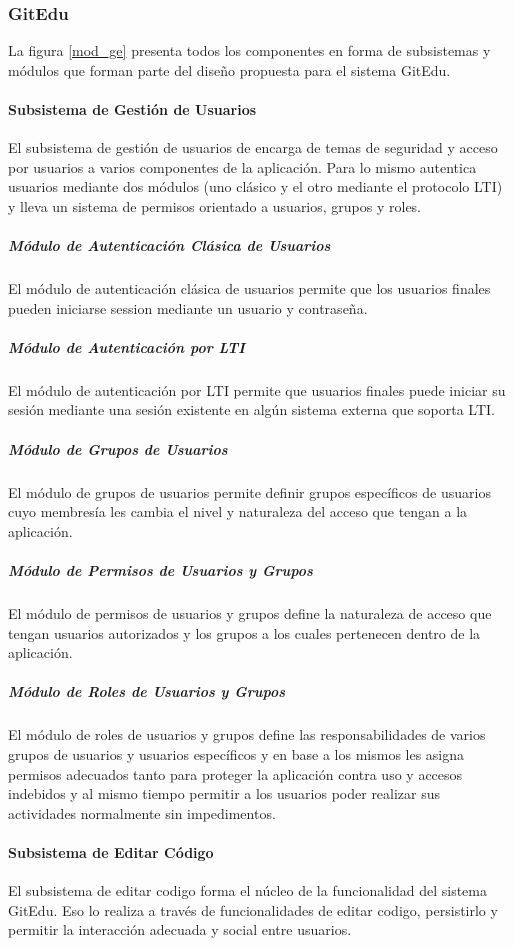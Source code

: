 \subsubsection{GitEdu}

La figura \ref{mod_ge} presenta todos los componentes en forma de subsistemas y módulos que forman parte del diseño propuesta para el sistema GitEdu.

\paragraph{Subsistema de Gestión de Usuarios}
El subsistema de gestión de usuarios de encarga de temas de seguridad y acceso por usuarios a varios componentes de la aplicación. Para lo mismo autentica usuarios mediante dos módulos (uno clásico y el otro mediante el protocolo LTI) y lleva un sistema de permisos orientado a usuarios, grupos y roles.

\subparagraph{Módulo de Autenticación Clásica de Usuarios}
El módulo de autenticación clásica de usuarios permite que los usuarios finales pueden iniciarse session mediante un usuario y contraseña.

\subparagraph{Módulo de Autenticación por LTI}
El módulo de autenticación por LTI  permite que usuarios finales puede iniciar su sesión mediante una sesión existente en algún sistema externa que soporta LTI.

\subparagraph{Módulo de Grupos de Usuarios}
El módulo de grupos de usuarios permite definir grupos específicos de usuarios cuyo membresía les cambia el nivel y naturaleza del acceso que tengan a la aplicación.

\subparagraph{Módulo de Permisos de Usuarios y Grupos}
El módulo de permisos de usuarios y grupos define la naturaleza de acceso que tengan usuarios autorizados y los grupos a los cuales pertenecen dentro de la aplicación.

\subparagraph{Módulo de Roles de Usuarios y Grupos}
El módulo de roles de usuarios y grupos define las responsabilidades de varios grupos de usuarios y usuarios específicos y en base a los mismos les asigna permisos adecuados tanto para proteger la aplicación contra uso y accesos indebidos y al mismo tiempo permitir a los usuarios poder realizar sus actividades normalmente sin impedimentos.

\paragraph{Subsistema de Editar Código}
El subsistema de editar codigo forma el núcleo de la funcionalidad del sistema GitEdu. Eso lo realiza a través de funcionalidades de editar codigo, persistirlo y permitir la interacción adecuada y social entre usuarios.

